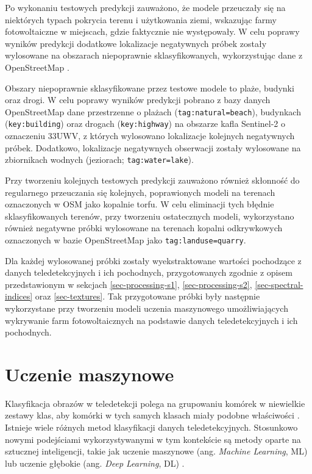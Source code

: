 \documentclass{amuthesis}
\begin{document}
Po wykonaniu testowych predykcji zauważono, że modele przeuczały się na
niektórych typach pokrycia terenu i użytkowania ziemi, wskazując farmy
fotowoltaiczne w miejscach, gdzie faktycznie nie występowały. W celu
poprawy wyników predykcji dodatkowe lokalizacje negatywnych próbek
zostały wylosowane na obszarach niepoprawnie sklasyfikowanych,
wykorzystując dane z OpenStreetMap \autocite{OpenStreetMap}.

Obszary niepoprawnie sklasyfikowane przez testowe modele to plaże,
budynki oraz drogi. W celu poprawy wyników predykcji pobrano z bazy
danych OpenStreetMap dane przestrzenne o plażach
(\texttt{tag:natural=beach}), budynkach (\texttt{key:building}) oraz
drogach (\texttt{key:highway}) na obszarze kafla Sentinel-2 o oznaczeniu
33UWV, z których wylosowano lokalizacje kolejnych negatywnych próbek.
Dodatkowo, lokalizacje negatywnych obserwacji zostały wylosowane na
zbiornikach wodnych (jeziorach; \texttt{tag:water=lake}).

Przy tworzeniu kolejnych testowych predykcji zauważono również skłonność
do regularnego przeuczania się kolejnych, poprawionych modeli na
terenach oznaczonych w OSM jako kopalnie torfu. W celu eliminacji tych
błędnie sklasyfikowanych terenów, przy tworzeniu ostatecznych modeli,
wykorzystano również negatywne próbki wylosowane na terenach kopalni
odkrywkowych oznaczonych w bazie OpenStreetMap jako
\texttt{tag:landuse=quarry}.

Dla każdej wylosowanej próbki zostały wyekstraktowane wartości
pochodzące z danych teledetekcyjnych i ich pochodnych, przygotowanych
zgodnie z opisem przedstawionym w sekcjach \ref{sec-processing-s1},
\ref{sec-processing-s2}, \ref{sec-spectral-indices} oraz
\ref{sec-textures}. Tak przygotowane próbki były następnie wykorzystane
przy tworzeniu modeli uczenia maszynowego umożliwiających wykrywanie
farm fotowoltaicznych na podstawie danych teledetekcyjnych i ich
pochodnych.

\hypertarget{sec-machine-learning}{%
\section{Uczenie maszynowe}\label{sec-machine-learning}}

Klasyfikacja obrazów w teledetekcji polega na grupowaniu komórek w
niewielkie zestawy klas, aby komórki w tych samych klasach miały podobne
właściwości \autocite{ismail_2009_classification}. Istnieje wiele
różnych metod klasyfikacji danych teledetekcyjnych. Stosunkowo nowymi
podejściami wykorzystywanymi w tym kontekście są metody oparte na
sztucznej inteligencji, takie jak uczenie maszynowe (ang. \emph{Machine
Learning}, ML) lub uczenie głębokie (ang. \emph{Deep Learning}, DL)
\autocite{hejmanowska_2020_dane}.
\end{document}
